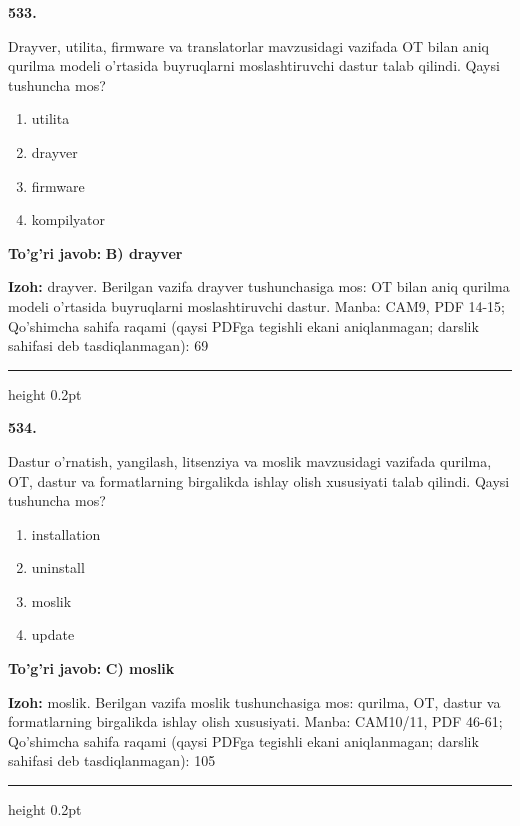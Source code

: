 \documentclass[10pt,a4paper]{article}
\begin{document}
{\bfseries\sffamily\color{ink} 533.}
\par
Drayver, utilita, firmware va translatorlar mavzusidagi vazifada OT bilan aniq qurilma modeli o'rtasida buyruqlarni moslashtiruvchi dastur talab qilindi. Qaysi tushuncha mos?
\begin{enumerate}[label=\Alph*),leftmargin=9mm]
\item utilita
\item drayver
\item firmware
\item kompilyator
\end{enumerate}
\begin{tcolorbox}[enhanced,breakable,colback=teal!4,colframe=teal!60!black,boxrule=0.45pt,arc=1.2mm,left=2.7mm,right=2.7mm,top=1.8mm,bottom=1.8mm,before skip=2mm,after skip=2mm]
{\bfseries\sffamily\color{teal}To'g'ri javob:} \textbf{B) drayver}
\par\smallskip
{\bfseries Izoh:} drayver. Berilgan vazifa drayver tushunchasiga mos: OT bilan aniq qurilma modeli o'rtasida buyruqlarni moslashtiruvchi dastur. Manba: CAM9, PDF 14-15; Qo'shimcha sahifa raqami (qaysi PDFga tegishli ekani aniqlanmagan; darslik sahifasi deb tasdiqlanmagan): 69
\end{tcolorbox}
\vspace{2mm}\hrule height 0.2pt\vspace{3mm}

{\bfseries\sffamily\color{ink} 534.}
\par
Dastur o'rnatish, yangilash, litsenziya va moslik mavzusidagi vazifada qurilma, OT, dastur va formatlarning birgalikda ishlay olish xususiyati talab qilindi. Qaysi tushuncha mos?
\begin{enumerate}[label=\Alph*),leftmargin=9mm]
\item installation
\item uninstall
\item moslik
\item update
\end{enumerate}
\begin{tcolorbox}[enhanced,breakable,colback=teal!4,colframe=teal!60!black,boxrule=0.45pt,arc=1.2mm,left=2.7mm,right=2.7mm,top=1.8mm,bottom=1.8mm,before skip=2mm,after skip=2mm]
{\bfseries\sffamily\color{teal}To'g'ri javob:} \textbf{C) moslik}
\par\smallskip
{\bfseries Izoh:} moslik. Berilgan vazifa moslik tushunchasiga mos: qurilma, OT, dastur va formatlarning birgalikda ishlay olish xususiyati. Manba: CAM10/11, PDF 46-61; Qo'shimcha sahifa raqami (qaysi PDFga tegishli ekani aniqlanmagan; darslik sahifasi deb tasdiqlanmagan): 105
\end{tcolorbox}
\vspace{2mm}\hrule height 0.2pt\vspace{3mm}
\end{document}

